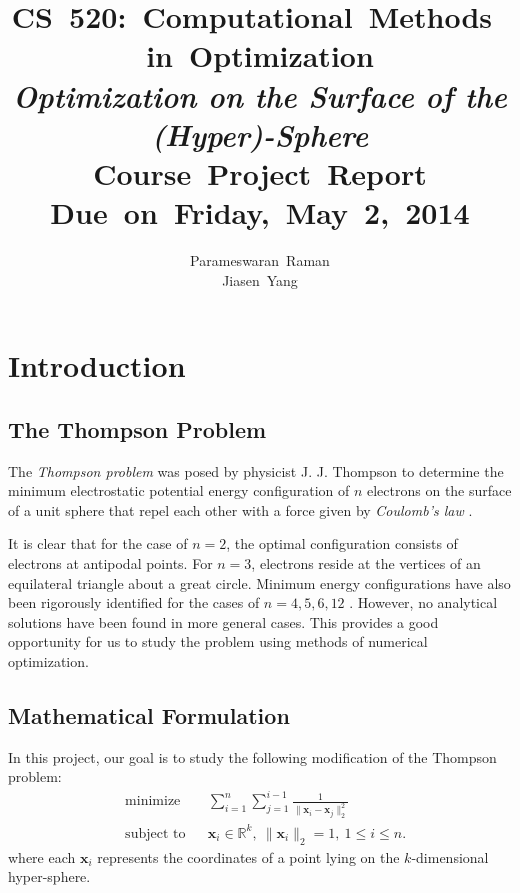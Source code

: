 \documentclass[11pt]{article}
\title{
\vspace{2in}
\textmd{\textbf{CS\ 520:\ Computational\ Methods\ in\ Optimization}\\ \emph{Optimization on the Surface of the (Hyper)-Sphere}\\ \textbf{Course\ Project\ Report}}\\
\normalsize\vspace{0.1in}\small{Due\ on\ Friday,\ May\ 2,\ 2014}\\
\vspace{3in}
}
\author{Parameswaran\ Raman\footnotemark[1]\\ Jiasen\ Yang\footnotemark[2]}
\date{} %
\begin{document}


\maketitle
\thispagestyle{empty}

\newpage
\tableofcontents
\newpage

\setcounter{page}{1}

\section{Introduction}

\subsection{The Thompson Problem}

The \emph{Thompson problem} was posed by physicist J. J. Thompson to determine the minimum electrostatic potential energy configuration of $n$ electrons on the surface of a unit sphere that repel each other with a force given by \emph{Coulomb's law} \cite{WikiThompson}.

It is clear that for the case of $n=2$, the optimal configuration consists of electrons at antipodal points.
For $n=3$, electrons reside at the vertices of an equilateral triangle about a great circle.
Minimum energy configurations have also been rigorously identified for the cases of $n = 4, 5, 6, 12$ \cite{WikiThompson}.
However, no analytical solutions have been found in more general cases.
This provides a good opportunity for us to study the problem using methods of numerical optimization.

\subsection{Mathematical Formulation}

In this project, our goal is to study the following  modification of the Thompson problem:
\begin{equation}\label{eq:Thompson1}
\begin{aligned}
& \text{minimize}
& & \sum_{i=1}^n\sum_{j=1}^{i-1}\frac{1}{\|\bm{x}_i-\bm{x}_j\|_2^2} \\
& \text{subject to}
& & \bm{x}_i\in\mathbb{R}^k,\ \|\bm{x}_i\|_2 = 1,\ 1 \le i \le n.
\end{aligned}
\end{equation}
where each $\bm{x}_i$ represents the coordinates of a point lying on the $k$-dimensional hyper-sphere.
\end{document}

